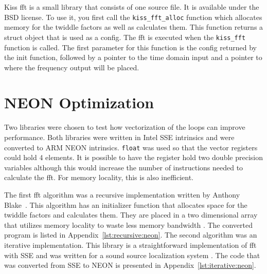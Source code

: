 Kiss \gls{fft} is a small library that consists of one source file. It is available under the BSD license. To use it, you first call the \texttt{kiss\_fft\_alloc} function which allocates memory for the twiddle factors as well as calculates them. This function returns a struct object that is used as a config. The \gls{fft} is executed when the \texttt{kiss\_fft} function is called. The first parameter for this function is the config returned by the init function, followed by a pointer to the time domain input and a pointer to where the frequency output will be placed.

\section{NEON Optimization}

Two libraries were chosen to test how vectorization of the loops can improve performance. Both libraries were written in Intel SSE intrinsics and were converted to ARM NEON intrinsics. \texttt{float} was used so that the vector registers could hold 4 elements. It is possible to have the register hold two double precision variables although this would increase the number of instructions needed to calculate the \gls{fft}. For memory locality, this is also inefficient.

The first \gls{fft} algorithm was a recursive implementation written by Anthony Blake~\cite{neon:recursive}. This algorithm has an initializer function that allocates space for the twiddle factors and calculates them. They are placed in a two dimensional array that utilizes memory locality to waste less memory bandwidth \cite{neon:recursive:details}. The converted program is listed in Appendix~\ref{lst:recursive:neon}. The second algorithm was an iterative implementation. This library is a straightforward implementation of \gls{fft} with SSE \cite{code:manyears} and was written for a sound source localization system \cite{manyears:site}. The code that was converted from SSE to NEON is presented in Appendix~\ref{lst:iterative:neon}.
